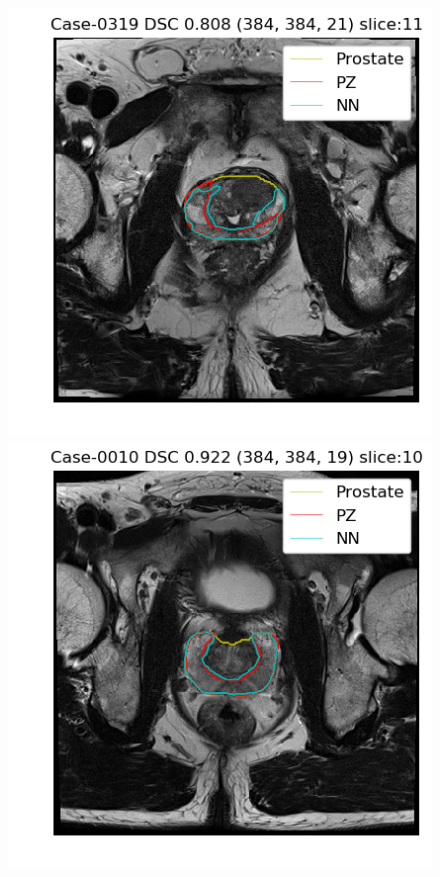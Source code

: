 \begin{figure}[h]
    \includegraphics[totalheight=.2\textheight]{figures/results/PZ_Px_Challenge__P_yes_Original_MEAN_Case-0319.png}
    \includegraphics[totalheight=.2\textheight]{figures/results/PZ_Px_Challenge__P_yes_Original_MAX_Case-0010.png}
    \vspace{10mm}

\end{figure}
